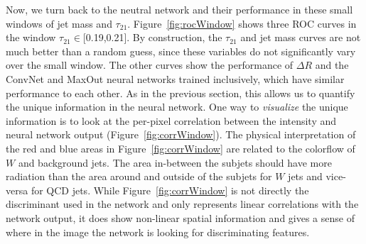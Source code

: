 
Now, we turn back to the neutral network and their performance in these small windows of jet mass and $\tau_{21}$.    Figure~\ref{fig:rocWindow} shows three ROC curves in the window $\tau_{21} \in$[0.19,0.21].  By construction, the $\tau_{21}$ and jet mass curves are not much better than a random guess, since these variables do not significantly vary over the small window.    The other curves show the performance of $\Delta R$ and the ConvNet and MaxOut neural networks trained inclusively, which have similar performance to each other.   As in the previous section, this allows us to quantify the unique information in the neural network.   One way to {\it visualize} the unique information is to look at the per-pixel correlation between the intensity and neural network output (Figure~\ref{fig:corrWindow}).  The physical interpretation of the red and blue areas in Figure~\ref{fig:corrWindow} are related to the colorflow of $W$ and background jets.  The area in-between the subjets should have more radiation than the area around and outside of the subjets for $W$ jets and vice-versa for QCD jets.  While Figure~\ref{fig:corrWindow} is not directly the discriminant used in the network and only represents linear correlations with the network output, it does show non-linear spatial information and gives a sense of where in the image the network is looking for discriminating features.



